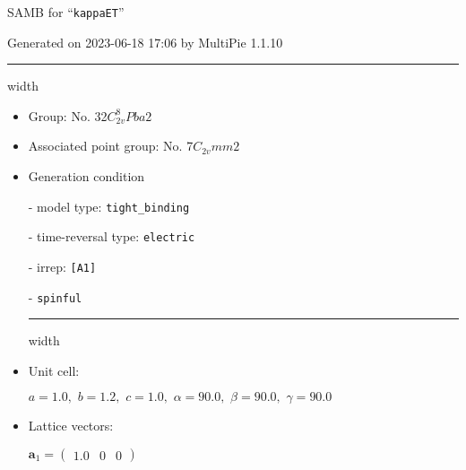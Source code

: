 \documentclass[fleqn,10pt,landscape]{article}
\begin{document}
\setcounter{MaxMatrixCols}{16}

\setlength{\baselineskip}{16pt}
\footnotesize
\begin{center}
\LARGE
SAMB for ``\texttt{kappaET}''
\end{center}
\begin{flushright}
Generated on 2023-06-18 17:06 by MultiPie 1.1.10
\end{flushright}
\vspace{1cm}


 \hfil \hrule height 1mm width \textwidth \hfil

\begin{itemize}
\item Group: No. 32\quad$C_{2v}^{8}$\quad$Pba2$\quad[ orthorhombic ]

\item Associated point group: No. 7\quad$C_{2v}$\quad$mm2$\quad[ orthorhombic ]

\vspace{5mm}

\item Generation condition

\quad - model type: \texttt{tight_binding}

\quad - time-reversal type: \texttt{electric}

\quad - irrep: \texttt{[A1]}

\quad - \texttt{spinful}


 \hfil \hrule height 1mm width \textwidth \hfil

\item Unit cell:

\quad $a=1.0,\,\, b=1.2,\,\, c=1.0,\,\, \alpha=90.0,\,\, \beta=90.0,\,\, \gamma=90.0$

\item Lattice vectors:

\quad $\bm{a}_1=\begin{pmatrix} 1.0 & 0 & 0 \end{pmatrix}$


\end{itemize}
\end{document}
